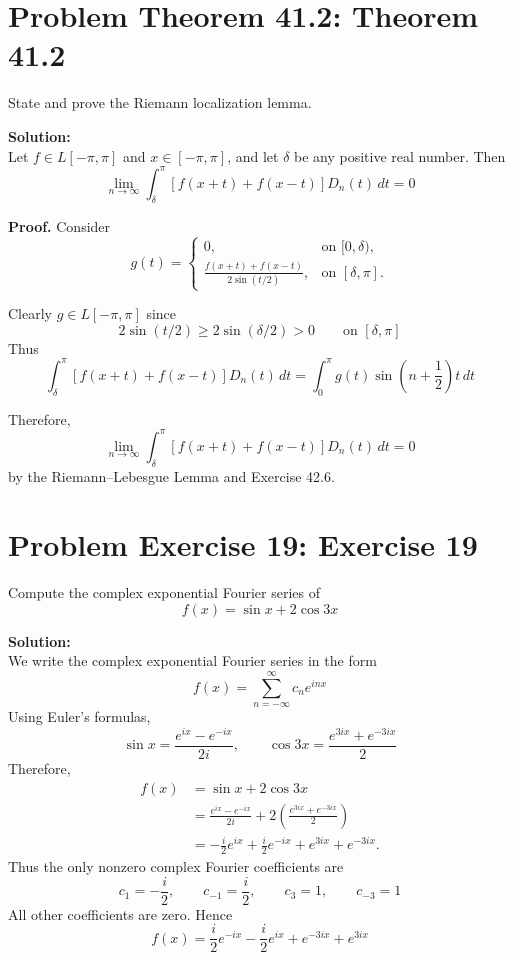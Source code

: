 \documentclass[a4paper]{article}
\theoremstyle{definition}
\newcounter{problem}
\newenvironment{problem}[1][]
{
    \stepcounter{problem}
    \section*{Problem \theproblem\ifx\relax#1\relax\else: #1\fi}
}
{}
\newenvironment{solution}
{
    \noindent\textbf{Solution:}\\
}
{
    
}
\begin{document}
\newpage
\begin{problem}[Theorem 41.2]
State and prove the Riemann localization lemma.
\end{problem}

\vspace{2em}
\begin{solution}
Let $f\in L[-\pi,\pi]$ and $x\in[-\pi,\pi]$, and let $\delta$ be any positive real number.
Then
\[
    \lim_{n\to\infty}
    \int_\delta^\pi [f(x+t)+f(x-t)]D_n(t)\,dt
    =
    0
\]

\textbf{Proof.}
Consider
\[
g(t)=
\begin{cases}
0, & \text{on } [0,\delta),\\[6pt]
\displaystyle
\frac{f(x+t)+f(x-t)}{2\sin(t/2)},
& \text{on } [\delta,\pi].
\end{cases}
\]

Clearly $g\in L[-\pi,\pi]$ since
\[
    2\sin(t/2)\ge 2\sin(\delta/2)>0
    \qquad \text{on } [\delta,\pi]
\]
Thus
\[
\int_\delta^\pi [f(x+t)+f(x-t)]D_n(t)\,dt
=
\int_0^\pi g(t)\sin\left(n+\frac12\right)t\,dt
\]

Therefore,
\[
\lim_{n\to\infty}
\int_\delta^\pi [f(x+t)+f(x-t)]D_n(t)\,dt
=
0
\]
by the Riemann--Lebesgue Lemma and Exercise 42.6.
\end{solution}

\newpage
\begin{problem}[Exercise 19]
Compute the complex exponential Fourier series of
\[
    f(x)=\sin x+2\cos 3x
\]
\end{problem}

\vspace{2em}
\begin{solution}
We write the complex exponential Fourier series in the form
\[
    f(x)=\sum_{n=-\infty}^{\infty} c_n e^{inx}
\]
Using Euler's formulas,
\[
    \sin x=\frac{e^{ix}-e^{-ix}}{2i},
    \qquad
    \cos 3x=\frac{e^{3ix}+e^{-3ix}}{2}
\]
Therefore,
\[
\begin{aligned}
    f(x)
    &=\sin x+2\cos 3x \\[4pt]
    &=\frac{e^{ix}-e^{-ix}}{2i}
      +2\left(\frac{e^{3ix}+e^{-3ix}}{2}\right) \\[4pt]
    &=-\frac{i}{2}e^{ix}
      +\frac{i}{2}e^{-ix}
      +e^{3ix}
      +e^{-3ix}.
\end{aligned}
\]
Thus the only nonzero complex Fourier coefficients are
\[
    c_1=-\frac{i}{2},
    \qquad
    c_{-1}=\frac{i}{2},
    \qquad
    c_3=1,
    \qquad
    c_{-3}=1
\]
All other coefficients are zero. Hence
\[
    f(x)
    =
    \frac{i}{2}e^{-ix}
    -\frac{i}{2}e^{ix}
    +e^{-3ix}
    +e^{3ix}
\]
\end{solution}
\end{document}
